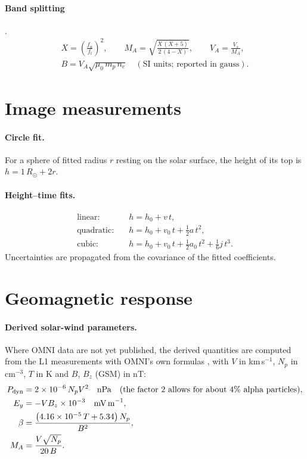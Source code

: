 \paragraph{Band splitting} \parencite{vrsnak2002}.
\begin{gather}
  X = \left(\frac{f_u}{f_l}\right)^2,\qquad
  M_A = \sqrt{\frac{X\,(X+5)}{2\,(4-X)}},\qquad
  V_A = \frac{V_s}{M_A},\\
  B = V_A\sqrt{\mu_0\,m_p\,n_e}\quad(\text{SI units; reported in gauss}).
\end{gather}

\section{Image measurements}

\paragraph{Circle fit.} For a sphere of fitted radius \(r\) resting on the solar surface, the
height of its top is \(h = 1\,R_\odot + 2r\).

\paragraph{Height--time fits.}
\begin{align}
  \text{linear:}\quad & h = h_0 + v\,t,\\
  \text{quadratic:}\quad & h = h_0 + v_0\,t + \tfrac12 a\,t^2,\\
  \text{cubic:}\quad & h = h_0 + v_0\,t + \tfrac12 a_0\,t^2 + \tfrac16 j\,t^3.
\end{align}
Uncertainties are propagated from the covariance of the fitted coefficients.

\section{Geomagnetic response}
\label{sec:geo-formulas}

\paragraph{Derived solar-wind parameters.} Where OMNI data are not yet published, the derived
quantities are computed from the L1 measurements with OMNI's own formulas
\parencite{king2005}, with \(V\) in km\,s\(^{-1}\), \(N_p\) in cm\(^{-3}\), \(T\) in K and
\(B\), \(B_z\) (GSM) in nT:
\begin{align}
  P_\mathrm{dyn} &= 2\times10^{-6}\,N_p V^2 \quad\text{nPa}
    \quad(\text{the factor 2 allows for about 4\% alpha particles}),\\
  E_y &= -V B_z\times10^{-3} \quad\text{mV\,m}^{-1},\\
  \beta &= \frac{\left(4.16\times10^{-5}\,T + 5.34\right) N_p}{B^2},\\
  M_A &= \frac{V\sqrt{N_p}}{20\,B}.
\end{align}

